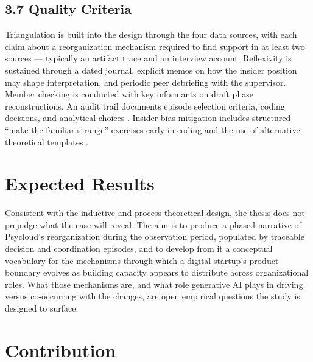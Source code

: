 \documentclass[11pt,a4paper]{article}
\begin{document}
\subsection*{3.7 Quality Criteria}

Triangulation is built into the design through the four data sources, with each claim about a reorganization mechanism required to find support in at least two sources --- typically an artifact trace and an interview account. Reflexivity is sustained through a dated journal, explicit memos on how the insider position may shape interpretation, and periodic peer debriefing with the supervisor. Member checking is conducted with key informants on draft phase reconstructions. An audit trail documents episode selection criteria, coding decisions, and analytical choices \citep{lincoln1985naturalistic}. Insider-bias mitigation includes structured ``make the familiar strange'' exercises early in coding and the use of alternative theoretical templates \citep{langley1999strategies}.

\section{Expected Results}

Consistent with the inductive and process-theoretical design, the thesis does not prejudge what the case will reveal. The aim is to produce a phased narrative of Psycloud's reorganization during the observation period, populated by traceable decision and coordination episodes, and to develop from it a conceptual vocabulary for the mechanisms through which a digital startup's product boundary evolves as building capacity appears to distribute across organizational roles. What those mechanisms are, and what role generative AI plays in driving versus co-occurring with the changes, are open empirical questions the study is designed to surface.

\section{Contribution}
\end{document}

